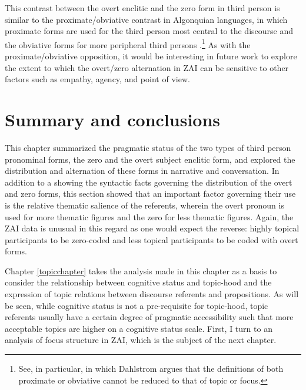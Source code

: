 This contrast between the overt enclitic and the zero form in third person is similar to the proximate/obviative contrast in Algonquian languages, in which proximate forms are used for the third person most central to the discourse and the obviative forms for more peripheral third persons \citep{dahlstrom1991,dahlstrom2003,dahlstrom2014}.\footnote{See, in particular, \citet{dahlstrom2014} in which Dahlstrom argues that the definitions of both proximate or obviative cannot be reduced to that of topic or focus.} As with the proximate/obviative opposition, it would be interesting in future work to explore the extent to which the overt/zero alternation in ZAI can be sensitive to other factors such as empathy, agency, and point of view.


\section{Summary and conclusions}
This chapter summarized the pragmatic status of the two types of third person pronominal forms, the zero and the overt subject enclitic form, and explored the distribution and alternation of these forms in narrative and conversation. In addition to a showing the syntactic facts governing the distribution of the overt and zero forms, this section showed that an important factor governing their use is the relative thematic salience of the referents, wherein the overt pronoun is used for more thematic figures and the zero for less thematic figures. Again, the ZAI data is unusual in this regard as one would expect the reverse: highly topical participants to be zero-coded and less topical participants to be coded with overt forms.

Chapter \ref{topicchapter} takes the analysis made in this chapter as a basis to consider the relationship between cognitive status and topic-hood and the expression of topic relations between discourse referents and propositions. As will be seen, while cognitive status is not a pre-requisite for topic-hood, topic referents usually have a certain degree of pragmatic accessibility such that more acceptable topics are higher on a cognitive status scale. First, I turn to an analysis of focus structure in ZAI, which is the subject of the next chapter.

